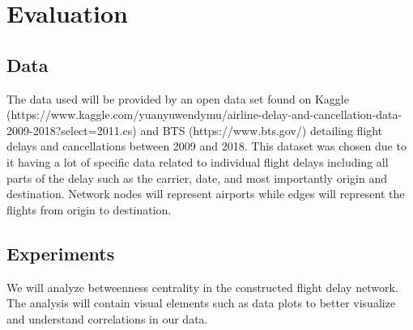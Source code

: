 \documentclass[sigconf,nonacm]{acmart}
\begin{document}
\section{Evaluation}
\subsection{Data}
The data used will be provided by an open data set found on Kaggle
(https://www.kaggle.com/yuanyuwendymu/airline-delay-and-cancellation-data-2009-2018?select=2011.cs) and BTS (https://www.bts.gov/) detailing flight
delays and cancellations between 2009 and 2018. This dataset was chosen due to it having a lot of specific data related to individual flight delays
including all parts of the delay such as the carrier, date, and most importantly origin and destination. Network nodes will represent airports while
edges will represent the flights from origin to destination.
\subsection{Experiments}
We will analyze betweenness centrality in the constructed flight delay network. The analysis will contain visual elements such as data plots to better visualize and understand correlations in our data.

  
  

  
  
















\appendix
\end{document}
